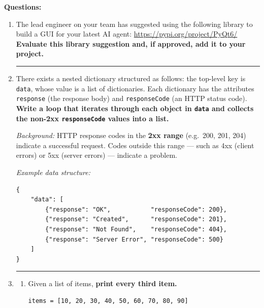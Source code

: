 \documentclass[12pt]{article}
\begin{document}
\bigskip
\noindent\textbf{Questions:}
\begin{enumerate}[leftmargin=*, label=\arabic*., itemsep=2em]

    \item The lead engineer on your team has suggested using the following library to build a GUI for your latest AI agent: \href{https://pypi.org/project/PyQt6/}{https://pypi.org/project/PyQt6/} \textbf{Evaluate this library suggestion and, if approved, add it to your project.}

    \vspace{1.5em}
    \noindent\rule{\linewidth}{0.4pt}

    \item There exists a nested dictionary structured as follows: the top-level key is \texttt{data}, whose value is a list of dictionaries. Each dictionary has the attributes \texttt{response} (the response body) and \texttt{responseCode} (an HTTP status code). \textbf{Write a loop that iterates through each object in \texttt{data} and collects the non-2xx \texttt{responseCode} values into a list.}

    \smallskip
    \noindent\textit{Background:} HTTP response codes in the \textbf{2xx range} (e.g.\ 200, 201, 204) indicate a successful request. Codes outside this range — such as 4xx (client errors) or 5xx (server errors) — indicate a problem.

    \smallskip
    \noindent\textit{Example data structure:}

    \begin{lstlisting}
{
    "data": [
        {"response": "OK",           "responseCode": 200},
        {"response": "Created",      "responseCode": 201},
        {"response": "Not Found",    "responseCode": 404},
        {"response": "Server Error", "responseCode": 500}
    ]
}
    \end{lstlisting}

    \vspace{1.5em}
    \noindent\rule{\linewidth}{0.4pt}

    \item \begin{enumerate}[label=(\alph*), itemsep=1.5em]

        \item Given a list of items, \textbf{print every third item.}

        \begin{lstlisting}
items = [10, 20, 30, 40, 50, 60, 70, 80, 90]
        \end{lstlisting}


\end{enumerate}
\end{enumerate}
\end{document}
